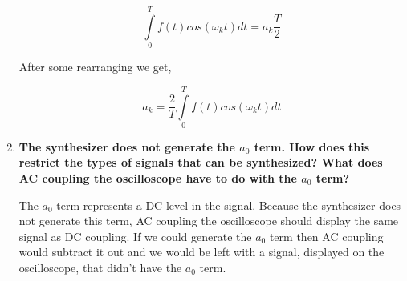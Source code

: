 \begin{enumerate}
\begin{equation}
\int\limits_0^Tf(t)cos(\omega_kt)dt=a_k\dfrac{T}{2}
\label{equ:fscg9}
\end{equation}

\noindent After some rearranging we get,

\begin{equation}
a_k=\dfrac{2}{T}\int\limits_{0}^{T}f(t)cos(\omega_kt)dt
\label{equ:fscg10}
\end{equation}

\item {\bf The synthesizer does not generate the $a_0$ term. How does this restrict the types of signals that can be synthesized?  What does AC coupling the oscilloscope have to do with the $a_0$ term?}\newline

The $a_0$ term represents a DC level in the signal. Because the synthesizer does not generate this term, AC coupling the oscilloscope should display the same signal as DC coupling. If we could generate the $a_0$ term then AC coupling would subtract it out and we would be left with a signal, displayed on the oscilloscope, that didn't have the $a_0$ term.

\end{enumerate}


\newpage
